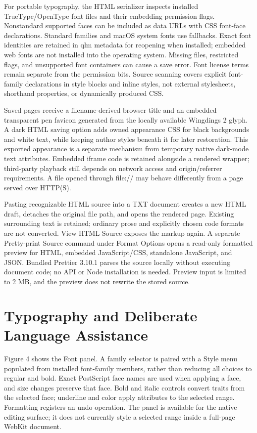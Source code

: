 \documentclass[manuscript,screen,nonacm]{acmart}
\begin{document}
For portable typography, the HTML serializer inspects installed TrueType/OpenType font files and their embedding permission flags. Nonstandard supported faces can be included as data URLs with CSS font-face declarations. Standard families and macOS system fonts use fallbacks. Exact font identities are retained in qlm metadata for reopening when installed; embedded web fonts are not installed into the operating system. Missing files, restricted flags, and unsupported font containers can cause a save error. Font license terms remain separate from the permission bits. Source scanning covers explicit font-family declarations in style blocks and inline styles, not external stylesheets, shorthand properties, or dynamically produced CSS.

Saved pages receive a filename-derived browser title and an embedded transparent pen favicon generated from the locally available Wingdings 2 glyph. A dark HTML saving option adds owned appearance CSS for black backgrounds and white text, while keeping author styles beneath it for later restoration. This exported appearance is a separate mechanism from temporary native dark-mode text attributes. Embedded iframe code is retained alongside a rendered wrapper; third-party playback still depends on network access and origin/referrer requirements. A file opened through file:// may behave differently from a page served over HTTP(S).

Pasting recognizable HTML source into a TXT document creates a new HTML draft, detaches the original file path, and opens the rendered page. Existing surrounding text is retained; ordinary prose and explicitly chosen code formats are not converted. View HTML Source exposes the markup again. A separate Pretty-print Source command under Format Options opens a read-only formatted preview for HTML, embedded JavaScript/CSS, standalone JavaScript, and JSON. Bundled Prettier 3.10.1 parses the source locally without executing document code; no API or Node installation is needed. Preview input is limited to 2 MB, and the preview does not rewrite the stored source.

\section{Typography and Deliberate Language Assistance}

Figure 4 shows the Font panel. A family selector is paired with a Style menu populated from installed font-family members, rather than reducing all choices to regular and bold. Exact PostScript face names are used when applying a face, and size changes preserve that face. Bold and italic controls convert traits from the selected face; underline and color apply attributes to the selected range. Formatting registers an undo operation. The panel is available for the native editing surface; it does not currently style a selected range inside a full-page WebKit document.
\end{document}
